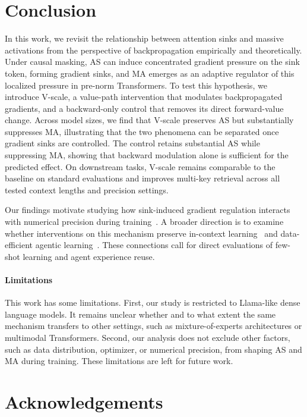 \documentclass{article}
\theoremstyle{plain}
\theoremstyle{definition}
\theoremstyle{remark}
\begin{document}
\section{Conclusion}
\label{sec:conclusion}

In this work, we revisit the relationship between attention sinks and massive activations from the perspective of backpropagation empirically and theoretically.
Under causal masking, AS can induce concentrated gradient pressure on the sink token, forming gradient sinks, 
and MA emerges as an adaptive regulator of this localized pressure in pre-norm Transformers.
To test this hypothesis, we introduce V-scale, a value-path intervention that modulates backpropagated gradients, 
and a backward-only control that removes its direct forward-value change.
Across model sizes, we find that V-scale preserves AS but substantially suppresses MA, 
illustrating that the two phenomena can be separated once gradient sinks are controlled.
The control retains substantial AS while suppressing MA, 
showing that backward modulation alone is sufficient for the predicted effect.
On downstream tasks, 
V-scale remains comparable to the baseline on standard evaluations and improves multi-key retrieval across all tested context lengths and precision settings.

Our findings motivate studying how sink-induced gradient regulation interacts with numerical precision during training~\cite{qiu2026flash}. A broader direction is to examine whether interventions on this mechanism preserve in-context learning~\cite{wu2025icl} and data-efficient agentic learning~\cite{wang2026deal}. These connections call for direct evaluations of few-shot learning and agent experience reuse.

\paragraph{Limitations}
This work has some limitations. First, our study is restricted to Llama-like dense language models. It remains unclear whether and to what extent the same mechanism transfers to other settings, such as mixture-of-experts architectures or multimodal Transformers. Second, our analysis does not exclude other factors, such as data distribution, optimizer, or numerical precision, from shaping AS and MA during training. These limitations are left for future work.

\section*{Acknowledgements}
\end{document}
